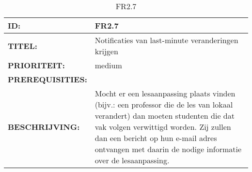 
\noindent\begin{table}[H]
            \begin{tabular}{l | p{10cm}}
                \textbf{ID:} & FR2.7 \\ \hline
                \textbf{TITEL:} & Notificaties van last-minute veranderingen krijgen\\ \hline
                \textbf{PRIORITEIT:} &  medium \\ \hline
                \textbf{PREREQUISITIES:} & \\ \hline
                \textbf{BESCHRIJVING:} & Mocht er een lesaanpassing plaats vinden (bijv.: een professor die de les van lokaal verandert) dan moeten studenten die dat vak volgen verwittigd worden. 
                                        Zij zullen dan een bericht op hun e-mail adres ontvangen met daarin de nodige informatie over de lesaanpassing.\\
            \end{tabular}\\
            \caption{FR2.7}
			\label{tab:FR2.7}
        \end{table}
\clearpage